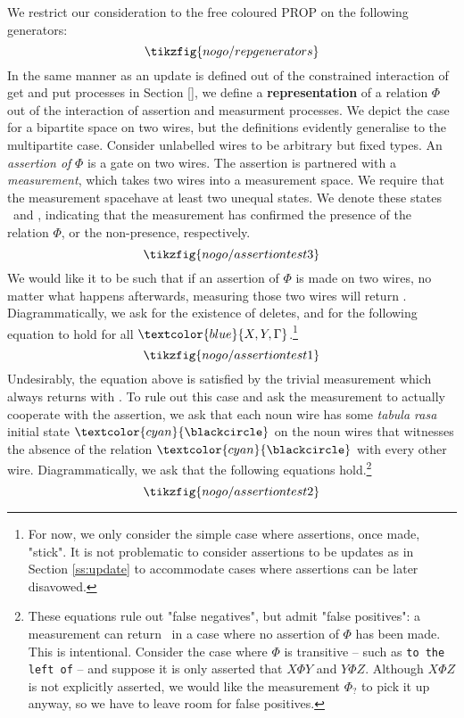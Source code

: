 \begin{defn}
We restrict our consideration to the free coloured PROP on the following generators:
\[\tikzfig{nogo/repgenerators}\]
In the same manner as an update is defined out of the constrained interaction of get and put processes in Section \ref{}, we define a \textbf{representation} of a relation $\Phi$ out of the interaction of assertion and measurment processes. We depict the case for a bipartite space on two wires, but the definitions evidently generalise to the multipartite case. Consider unlabelled wires to be arbitrary but fixed types. An \emph{assertion of} $\Phi$ is a gate on two wires. The assertion is partnered with a \emph{measurement}, which takes two wires into a \bM measurement space\e. We require that the \bM measurement space\e have at least two unequal states. We denote these states \faThumbsOUp \ and \faThumbsODown, indicating that the measurement has confirmed the presence of the relation $\Phi$, or the non-presence, respectively.
\[\tikzfig{nogo/assertiontest3}\]
We would like it to be such that if an assertion of $\Phi$ is made on two wires, no matter what happens afterwards, measuring those two wires will return \faThumbsOUp. Diagrammatically, we ask for the existence of deletes, and for the following equation to hold for all $\textcolor{blue}{X,Y,\Gamma}$.\footnote{For now, we only consider the simple case where assertions, once made, "stick". It is not problematic to consider assertions to be updates as in Section \ref{ss:update} to accommodate cases where assertions can be later disavowed.}
\[\tikzfig{nogo/assertiontest1}\]
Undesirably, the equation above is satisfied by the trivial measurement which always returns with \faThumbsOUp. To rule out this case and ask the measurement to actually cooperate with the assertion, we ask that each noun wire has some \emph{tabula rasa} initial state $\textcolor{cyan}{\blackcircle}$ on the noun wires that witnesses the absence of the relation $\textcolor{cyan}{\blackcircle}$ with every other wire. Diagrammatically, we ask that the following equations hold.\footnote{These equations rule out "false negatives", but admit "false positives": a measurement can return \faThumbsOUp \ in a case where no assertion of $\Phi$ has been made. This is intentional. Consider the case where $\Phi$ is transitive -- such as \texttt{to the left of} -- and suppose it is only asserted that $X\Phi Y$ and $Y \Phi Z$. Although $X \Phi Z$ is not explicitly asserted, we would like the measurement $\Phi_?$ to pick it up anyway, so we have to leave room for false positives.}
\[\tikzfig{nogo/assertiontest2}\]
\end{defn}

